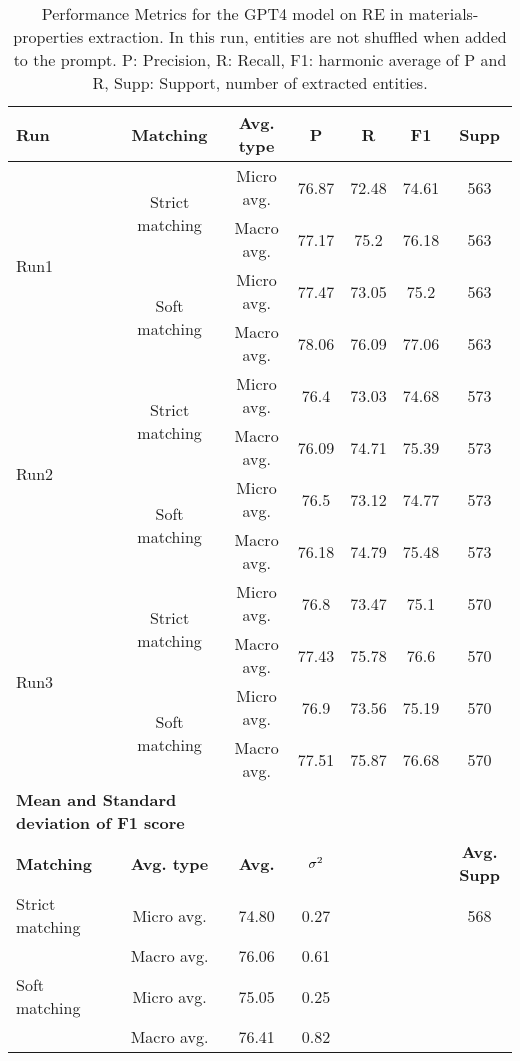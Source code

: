 
\begin{table}[htbp]
    \small
    \centering
    \caption{Performance Metrics for the GPT4 model on RE in materials-properties extraction. In this run, entities are not shuffled when added to the prompt. P: Precision, R: Recall, F1: harmonic average of P and R, Supp: Support, number of extracted entities.}
    \begin{tabular}{lcccccc}
        \toprule
        \textbf{Run} & \textbf{Matching} & \textbf{Avg. type} & \textbf{P} & \textbf{R} & \textbf{F1} & \textbf{Supp} \\
        \midrule
        \multirow{4}{*}{Run1} & \multirow{2}{*}{Strict matching} & Micro avg. & 76.87 & 72.48 & 74.61 & 563 \\
        & & Macro avg. & 77.17 & 75.2 & 76.18 & 563 \\
        \cmidrule{2-7}
        & \multirow{2}{*}{Soft matching} & Micro avg. & 77.47 & 73.05 & 75.2 & 563 \\
        & & Macro avg. & 78.06 & 76.09 & 77.06 & 563 \\
        \midrule
        \multirow{4}{*}{Run2} & \multirow{2}{*}{Strict matching} & Micro avg. & 76.4 & 73.03 & 74.68 & 573 \\
        & & Macro avg. & 76.09 & 74.71 & 75.39 & 573 \\
        \cmidrule{2-7}
        & \multirow{2}{*}{Soft matching} & Micro avg. & 76.5 & 73.12 & 74.77 & 573 \\
        & & Macro avg. & 76.18 & 74.79 & 75.48 & 573 \\
        \midrule
        \multirow{4}{*}{Run3} & \multirow{2}{*}{Strict matching} & Micro avg. & 76.8 & 73.47 & 75.1 & 570 \\
        & & Macro avg. & 77.43 & 75.78 & 76.6 & 570 \\
        \cmidrule{2-7}
        & \multirow{2}{*}{Soft matching} & Micro avg. & 76.9 & 73.56 & 75.19 & 570 \\
        & & Macro avg. & 77.51 & 75.87 & 76.68 & 570 \\
        \midrule
        \multicolumn{2}{l}{\textbf{Mean and Standard deviation of F1 score}} & & & & & \\
        \midrule
        \textbf{Matching} & \textbf{Avg. type} & \textbf{Avg.} & $\sigma\textsuperscript{2}$ & & & \textbf{Avg. Supp}\\
        Strict matching & Micro avg. & 74.80 & 0.27 & & & 568 \\
        & Macro avg. & 76.06 & 0.61 & & & \\
        Soft matching & Micro avg. & 75.05 & 0.25 & & \\
        & Macro avg. & 76.41 & 0.82 & & \\
        \bottomrule
    \end{tabular}
\end{table}

